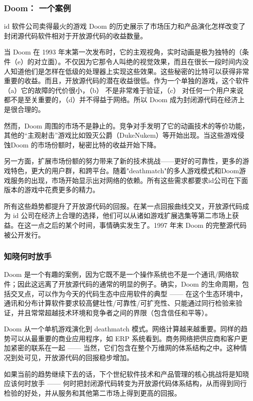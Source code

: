 \subsubsection{Doom： 一个案例}
id 软件公司卖得最火的游戏 Doom 的历史展示了市场压力和产品演化怎样改变了封闭源代码软件相对于开放源代码的收益数量。


当 Doom 在 1993 年末第一次发布时，它的主观视角，实时动画是极为独特的（条件（e）的对立面）。不仅因为它那令人叫绝的视觉效果，而且在很长一段时间内没人知道他们是怎样在低级的处理器上实现这些效果。这些秘密的比特可以获得非常重要的收益。而且，开放源代码的潜在收益很低。作为一个单独的游戏，这个软件（a）它的故障的代价很小，（b） 不是非常难于验证，（c） 对任何一个用户来说都不是至关重要的，（d）并不得益于网络。所以 Doom 成为封闭源代码在经济上是很合理的。


然而，Doom 周围的市场不是静止的。竞争对手发明了它的动画技术的等价功能，其他的“主观射击”游戏比如毁灭公爵（DukeNukem）等开始出现。当这些游戏侵蚀Doom 的市场份额时，秘密比特的收益开始下降。


另一方面，扩展市场份额的努力带来了新的技术挑战——更好的可靠性，更多的游戏特色，更大的用户群，和跨平台。随着"deathmatch"的多人游戏模式和Doom游戏服务的出现，市场开始显示出对网络的依赖。所有这些需求都要求id公司在下面版本的游戏中花费更多的精力。


所有这些趋势都提升了开放源代码的回报。在某一点回报曲线交叉，开放源代码成为 id 公司在经济上合理的选择，他们可以从诸如游戏扩展选集等第二市场上获益。在这一点之后的某个时间，事情确实发生了。1997 年末 Doom 的完整源代码被公开发行。

\subsubsection{知晓何时放手}
Doom 是一个有趣的案例，因为它既不是一个操作系统也不是一个通讯/网络软件；因此这远离了开放源代码的通常的明显的例子。确实，Doom 的生命周期，包括交叉点，可以作为今天的代码生态中应用软件的典型 —— 在这个生态环境中，通讯和分布计算软件要求较高健壮性/可靠性/可扩充性、只能通过同行检验来验证，并且常常超越技术环境和竞争者之间的界限（包含信任和平等）。


Doom 从一个单机游戏演化到 deathmatch 模式。网络计算越来越重要。同样的趋势可以从最重要的商业应用程序，如 ERP 系统看到。商务网络把供应商和客户更加紧密的联系在一起 —— 当然，它们包含在整个万维网的体系结构之中。这种情况到处可见，开放源代码的回报稳步增加。


如果当前的趋势继续下去的话，下个世纪软件技术和产品管理的核心挑战将是知晓应该何时放手 —— 何时把封闭源代码转变为开放源代码体系结构，从而得到同行检验的好处，并从服务和其他第二市场上得到更高的回报。


